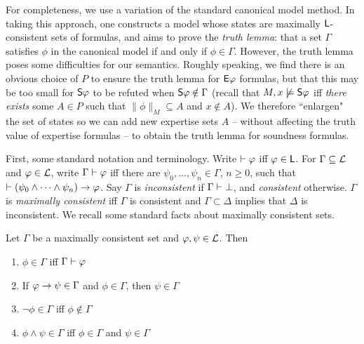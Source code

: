 For completeness, we use a variation of the standard canonical model method.
In taking this approach, one constructs a model whose states are maximally
$\sL$-consistent sets of formulas, and aims to prove the \emph{truth lemma}:
that a set $\Gamma$ satisfies $\phi$ in the canonical model if and only if
$\phi \in \Gamma$. However, the truth lemma poses some difficulties for our
semantics. Roughly speaking, we find there is an obvious choice of $P$ to
ensure the truth lemma for $\E\phi$ formulas, but that this may be too small
for $\S\phi$ to be refuted when $\S\phi \notin \Gamma$ (recall that $M, x
\not\models \S\phi$ iff \emph{there exists} some $A \in P$ such that
$\|\phi\|_M \subseteq A$ and $x \notin A$). We therefore ``enlargen" the set of
states so we can add new expertise sets $A$ -- without affecting the truth
value of expertise formulas -- to obtain the truth lemma for soundness
formulas.

First, some standard notation and terminology. Write $\thm \phi$ iff
$\phi \in \sL$. For $\Gamma \subseteq \cL$ and $\phi \in \cL$, write $\Gamma
\thm \phi$ iff there are $\psi_0, \ldots, \psi_n \in \Gamma$, $n \ge 0$, such
that $\thm (\psi_0 \land \cdots \land \psi_n) \limplies \phi$.  Say $\Gamma$
is \emph{inconsistent} if $\Gamma \entails \bot$, and
\emph{consistent} otherwise. $\Gamma$ is \emph{maximally
consistent} iff $\Gamma$ is consistent and $\Gamma \subset \Delta$ implies that
$\Delta$ is inconsistent. We recall some standard facts about maximally
consistent sets.

\begin{lemma}
\label{exp_lemma_mcs_facts}
    Let $\Gamma$ be a maximally consistent set and $\phi, \psi \in \cL$. Then
    \begin{enumerate}
        \item\label{exp_item_mcs_mem_entail} $\phi \in \Gamma$ iff $\Gamma \entails
            \phi$

        \item\label{exp_item_mcs_modpon} If $\phi \limplies \psi \in \Gamma$ and
            $\phi \in \Gamma$, then $\psi \in \Gamma$

        \item\label{exp_item_mcs_negations} $\neg\phi \in \Gamma$ iff $\phi \notin
            \Gamma$

        \item\label{exp_item_mcs_conjunctions} $\phi \land \psi \in \Gamma$ iff
            $\phi \in \Gamma$ and $\psi \in \Gamma$
    \end{enumerate}
\end{lemma}

